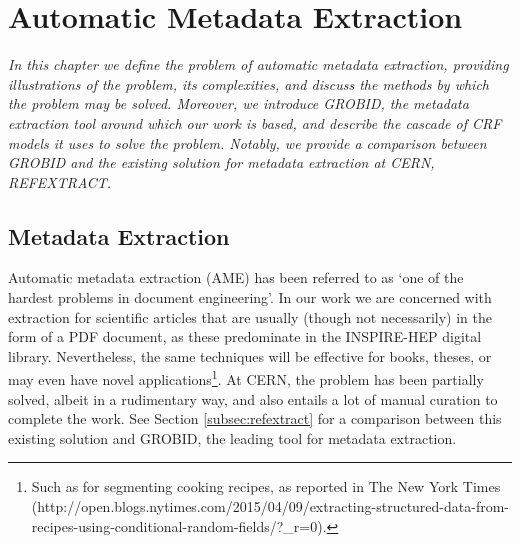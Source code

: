 
\chapter{Automatic Metadata Extraction} %

\label{Chapter3} %



\emph{In this chapter we define the problem of automatic metadata extraction, providing illustrations of the problem, its complexities, and discuss the methods by which the problem may be solved. Moreover, we introduce GROBID, the metadata extraction tool around which our work is based, and describe the cascade of CRF models it uses to solve the problem. Notably, we provide a comparison between GROBID and the existing solution for metadata extraction at CERN, REFEXTRACT.}

\section{Metadata Extraction}

Automatic metadata extraction (AME) has been referred to as `one of the hardest problems in document engineering'. In our work we are concerned with extraction for scientific articles that are usually (though not necessarily) in the form of a PDF document, as these predominate in the INSPIRE-HEP digital library. Nevertheless, the same techniques will be effective for books, theses, or may even have novel applications\footnote{Such as for segmenting cooking recipes, as reported in The New York Times (http://open.blogs.nytimes.com/2015/04/09/extracting-structured-data-from-recipes-using-conditional-random-fields/?\_r=0).}. At CERN, the problem has been partially solved, albeit in a rudimentary way, and also entails a lot of manual curation to complete the work. See Section \ref{subsec:refextract} for a comparison between this existing solution and GROBID, the leading tool for metadata extraction.

